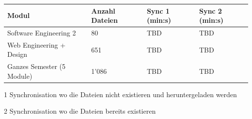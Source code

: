 \documentclass[a4paper]{article}
\begin{document}
  \begin{threeparttable}
    \begin{tabulary}{\linewidth}{Llll}
      \toprule
      Modul & Anzahl Dateien & Sync 1 (min:s)  & Sync 2 (min:s)  \\
      \midrule
      Software Engineering 2 & 80 & TBD & TBD \\
      Web Engineering + Design & 651 & TBD & TBD \\
      Ganzes Semester (5 Module) & 1'086 & TBD & TBD \\
      \bottomrule
    \end{tabulary}

    \begin{tablenotes}
      \item[1] Synchronisation wo die Dateien nicht existieren und heruntergeladen werden
      \item[2] Synchronisation wo die Dateien bereits existieren
    \end{tablenotes}
  \end{threeparttable}
\end{document}
